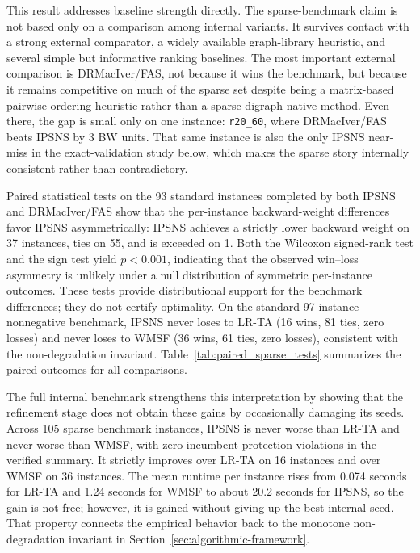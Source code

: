 This result addresses baseline strength directly. The sparse-benchmark claim is not based only on a comparison among internal variants. It survives contact with a strong external comparator, a widely available graph-library heuristic, and several simple but informative ranking baselines. The most important external comparison is DRMacIver/FAS, not because it wins the benchmark, but because it remains competitive on much of the sparse set despite being a matrix-based pairwise-ordering heuristic rather than a sparse-digraph-native method. Even there, the gap is small only on one instance: \texttt{r20\_60}, where DRMacIver/FAS beats IPSNS by 3 BW units. That same instance is also the only IPSNS near-miss in the exact-validation study below, which makes the sparse story internally consistent rather than contradictory.

Paired statistical tests on the 93 standard instances completed by both IPSNS and DRMacIver/FAS show that the per-instance backward-weight differences favor IPSNS asymmetrically: IPSNS achieves a strictly lower backward weight on 37 instances, ties on 55, and is exceeded on 1. Both the Wilcoxon signed-rank test and the sign test yield $p < 0.001$, indicating that the observed win--loss asymmetry is unlikely under a null distribution of symmetric per-instance outcomes. These tests provide distributional support for the benchmark differences; they do not certify optimality. On the standard 97-instance nonnegative benchmark, IPSNS never loses to LR-TA (16 wins, 81 ties, zero losses) and never loses to WMSF (36 wins, 61 ties, zero losses), consistent with the non-degradation invariant. Table~\ref{tab:paired_sparse_tests} summarizes the paired outcomes for all comparisons.



The full internal benchmark strengthens this interpretation by showing that the refinement stage does not obtain these gains by occasionally damaging its seeds. Across 105 sparse benchmark instances, IPSNS is never worse than LR-TA and never worse than WMSF, with zero incumbent-protection violations in the verified summary. It strictly improves over LR-TA on 16 instances and over WMSF on 36 instances. The mean runtime per instance rises from 0.074 seconds for LR-TA and 1.24 seconds for WMSF to about 20.2 seconds for IPSNS, so the gain is not free; however, it is gained without giving up the best internal seed. That property connects the empirical behavior back to the monotone non-degradation invariant in Section~\ref{sec:algorithmic-framework}.

